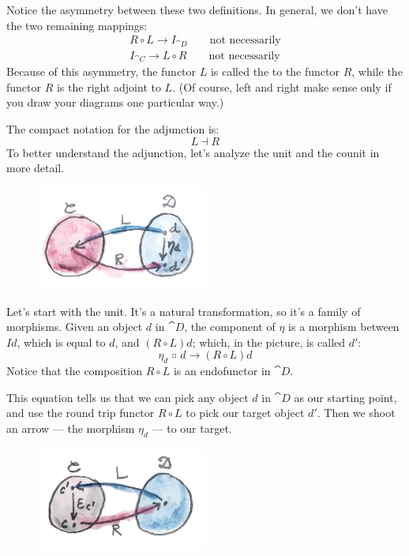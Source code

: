 Notice the asymmetry between these two definitions. In general, we don't
have the two remaining mappings:
\begin{gather*}
  R \circ L \to I_{\cat{D}} \quad\quad\text{not necessarily} \\
  I_{\cat{C}} \to L \circ R \quad\quad\text{not necessarily}
\end{gather*}
Because of this asymmetry, the functor $L$ is called the
 to the functor $R$, while the functor
$R$ is the right adjoint to $L$. (Of course, left and
right make sense only if you draw your diagrams one particular way.)

The compact notation for the adjunction is:
\[L \dashv R\]
To better understand the adjunction, let's analyze the unit and the
counit in more detail.

\begin{figure}[H]
  \centering
  \includegraphics[width=0.5\textwidth]{images/adj-unit.jpg}
\end{figure}

\noindent
Let's start with the unit. It's a natural transformation, so it's a
family of morphisms. Given an object $d$ in $\cat{D}$, the
component of $\eta$ is a morphism between $I d$, which is equal to
$d$, and $(R \circ L) d$; which, in the picture, is called
$d'$:
\[\eta_d \Colon d \to (R \circ L) d\]
Notice that the composition $R \circ L$ is an endofunctor in $\cat{D}$.

This equation tells us that we can pick any object $d$ in
$\cat{D}$ as our starting point, and use the round trip functor
$R \circ L$ to pick our target object $d'$. Then we
shoot an arrow --- the morphism $\eta_d$ --- to our target.

\begin{figure}[H]
  \centering
  \includegraphics[width=0.5\textwidth]{images/adj-counit.jpg}
\end{figure}

